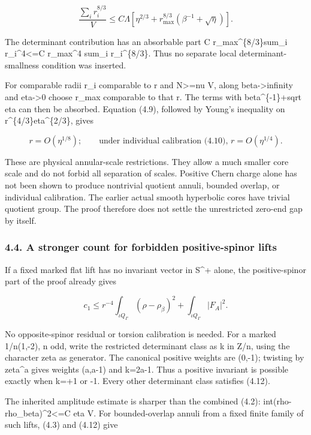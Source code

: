 \documentclass[
  10pt,
]{article}
\begin{document}
\[
 \boxed{\frac{\sum_i r_i^{8/3}}V\le C\Lambda
       [\eta^{2/3}+r_{\max}^{8/3}(\beta^{-1}+\sqrt\eta)].}       \tag{4.10}
\]

The determinant contribution has an absorbable part C
r\_max\^{}\{8/3\}sum\_i r\_i\^{}4\textless=C r\_max\^{}4 sum\_i
r\_i\^{}\{8/3\}. Thus no separate local determinant-smallness condition
was inserted.

For comparable radii r\_i comparable to r and N\textgreater=nu V, along
beta-\textgreater infinity and eta-\textgreater0 choose r\_max
comparable to that r. The terms with beta\^{}\{-1\}+sqrt eta can then be
absorbed. Equation (4.9), followed by Young's inequality on
r\^{}\{4/3\}eta\^{}\{2/3\}, gives

\[
 r=O(\eta^{1/8});\qquad
 \text{under individual calibration (4.10), }r=O(\eta^{1/4}).     \tag{4.11}
\]

These are physical annular-scale restrictions. They allow a much smaller
core scale and do not forbid all separation of scales. Positive Chern
charge alone has not been shown to produce nontrivial quotient annuli,
bounded overlap, or individual calibration. The earlier actual smooth
hyperbolic cores have trivial quotient group. The proof therefore does
not settle the unrestricted zero-end gap by itself.

\hypertarget{a-stronger-count-for-forbidden-positive-spinor-lifts}{%
\subsubsection{4.4. A stronger count for forbidden positive-spinor
lifts}\label{a-stronger-count-for-forbidden-positive-spinor-lifts}}

If a fixed marked flat lift has no invariant vector in S\^{}+ alone, the
positive-spinor part of the proof already gives

\[
 \boxed{c_1\le r^{-4}\int_{\iota Q_\Gamma}
                 (\rho-\rho_\beta)^2
                         +\int_{\iota Q_\Gamma}|F_A|^2.}        \tag{4.12}
\]

No opposite-spinor residual or torsion calibration is needed. For a
marked 1/n(1,-2), n odd, write the restricted determinant class as k in
Z/n, using the character zeta as generator. The canonical positive
weights are (0,-1); twisting by zeta\^{}a gives weights (a,a-1) and
k=2a-1. Thus a positive invariant is possible exactly when k=+1 or -1.
Every other determinant class satisfies (4.12).

The inherited amplitude estimate is sharper than the combined (4.2):
int(rho-rho\_beta)\^{}2\textless=C eta V. For bounded-overlap annuli
from a fixed finite family of such lifts, (4.3) and (4.12) give
\end{document}
